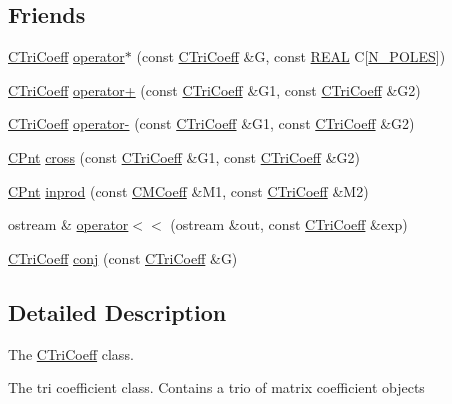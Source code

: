 \subsection*{Friends}
\begin{DoxyCompactItemize}
\item 
\hyperlink{classCTriCoeff}{C\-Tri\-Coeff} \hyperlink{classCTriCoeff_a8684b78e6ecaae7dfa436ee9f52365dd}{operator$\ast$} (const \hyperlink{classCTriCoeff}{C\-Tri\-Coeff} \&G, const \hyperlink{util_8h_a5821460e95a0800cf9f24c38915cbbde}{R\-E\-A\-L} C\mbox{[}\hyperlink{mcoeff_8h_ac23f9c13c5d07d9ce386f7a830c35e5a}{N\-\_\-\-P\-O\-L\-E\-S}\mbox{]})
\item 
\hyperlink{classCTriCoeff}{C\-Tri\-Coeff} \hyperlink{classCTriCoeff_a6678a29fe9fa9c5d7616a7151866fd4c}{operator+} (const \hyperlink{classCTriCoeff}{C\-Tri\-Coeff} \&G1, const \hyperlink{classCTriCoeff}{C\-Tri\-Coeff} \&G2)
\item 
\hyperlink{classCTriCoeff}{C\-Tri\-Coeff} \hyperlink{classCTriCoeff_a6849759bb53453f535b3b2e9379ef7d2}{operator-\/} (const \hyperlink{classCTriCoeff}{C\-Tri\-Coeff} \&G1, const \hyperlink{classCTriCoeff}{C\-Tri\-Coeff} \&G2)
\item 
\hyperlink{classCPnt}{C\-Pnt} \hyperlink{classCTriCoeff_ab5e8aeefc06a5962699ac639820d77be}{cross} (const \hyperlink{classCTriCoeff}{C\-Tri\-Coeff} \&G1, const \hyperlink{classCTriCoeff}{C\-Tri\-Coeff} \&G2)
\item 
\hyperlink{classCPnt}{C\-Pnt} \hyperlink{classCTriCoeff_a095588ecdb857546a57e3f8f33ec983d}{inprod} (const \hyperlink{classCMCoeff}{C\-M\-Coeff} \&M1, const \hyperlink{classCTriCoeff}{C\-Tri\-Coeff} \&M2)
\item 
ostream \& \hyperlink{classCTriCoeff_a47cfb1958c5a43e847aa4e45e1c2c5d4}{operator$<$$<$} (ostream \&out, const \hyperlink{classCTriCoeff}{C\-Tri\-Coeff} \&exp)
\item 
\hyperlink{classCTriCoeff}{C\-Tri\-Coeff} \hyperlink{classCTriCoeff_a66ea424a347d0a78069536bf701393a5}{conj} (const \hyperlink{classCTriCoeff}{C\-Tri\-Coeff} \&G)
\end{DoxyCompactItemize}


\subsection{Detailed Description}
The \hyperlink{classCTriCoeff}{C\-Tri\-Coeff} class. 

The tri coefficient class. Contains a trio of matrix coefficient objects 

